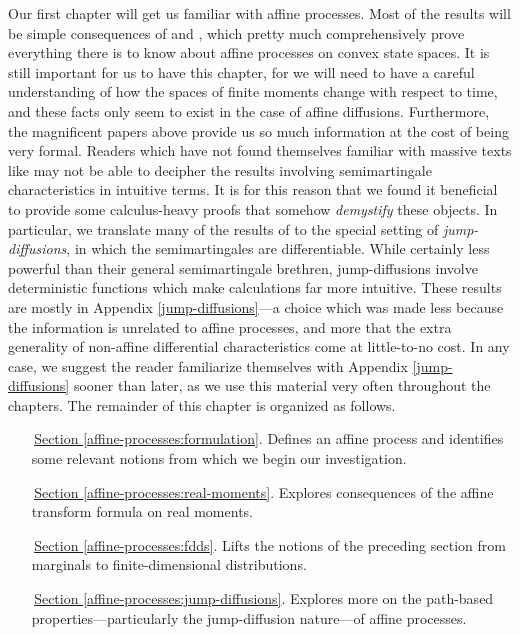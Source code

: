 Our first chapter will get us familiar with affine processes.
Most of the results will be simple consequences of \cite{cuchiero2011} and \cite{keller2015}, which pretty much comprehensively prove everything there is to know about affine processes on convex state spaces.
It is still important for us to have this chapter, for we will need to have a careful understanding of how the spaces of finite moments change with respect to time, and these facts only seem to exist in the case of affine diffusions.
Furthermore, the magnificent papers above provide us so much information at the cost of being very formal.
Readers which have not found themselves familiar with massive texts like \cite{jacod2003} may not be able to decipher the results involving semimartingale characteristics in intuitive terms.
It is for this reason that we found it beneficial to provide some calculus-heavy proofs that somehow \emph{demystify} these objects.
In particular, we translate many of the results of \cite{jacod2003} to the special setting of \emph{jump-diffusions}, in which the semimartingales are differentiable.
While certainly less powerful than their general semimartingale brethren, jump-diffusions involve deterministic functions which make calculations far more intuitive.
These results are mostly in Appendix \ref{jump-diffusions}---a choice which was made less because the information is unrelated to affine processes, and more that the extra generality of non-affine differential characteristics come at little-to-no cost.
In any case, we suggest the reader familiarize themselves with Appendix \ref{jump-diffusions} sooner than later, as we use this material very often throughout the chapters.
The remainder of this chapter is organized as follows.

\begin{enumerate}[leftmargin=20mm]
  \item[\,{\hyperref[affine-processes:formulation]{Section }}\ref{affine-processes:formulation}.]
    Defines an affine process and identifies some relevant notions from which we begin our investigation.
  \item[\,{\hyperref[affine-processes:real-moments]{Section }}\ref{affine-processes:real-moments}.]
    Explores consequences of the affine transform formula on real moments.
  \item[\,{\hyperref[affine-processes:fdds]{Section }}\ref{affine-processes:fdds}.]
    Lifts the notions of the preceding section from marginals to finite-dimensional distributions.
  \item[\,{\hyperref[affine-processes:jump-diffusions]{Section }}\ref{affine-processes:jump-diffusions}.]
    Explores more on the path-based properties---particularly the jump-diffusion nature---of affine processes.
\end{enumerate}
